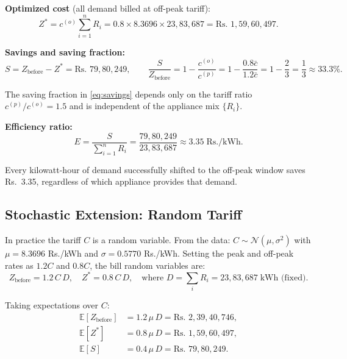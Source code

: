 \documentclass[12pt,a4paper]{article}
\begin{document}
\textbf{Optimized cost} (all demand billed at off-peak tariff):
\begin{equation}
  Z^* = c^{(o)}\sum_{i=1}^{n} R_i
  = 0.8 \times 8.3696 \times 23{,}83{,}687
  = \text{Rs.~} 1{,}59{,}60{,}497.
  \label{eq:zstar}
\end{equation}

\textbf{Savings and saving fraction:}
\begin{equation}
  S = Z_{\text{before}} - Z^* = \text{Rs.~} 79{,}80{,}249, \qquad
  \frac{S}{Z_{\text{before}}} = 1 - \frac{c^{(o)}}{c^{(p)}}
  = 1 - \frac{0.8\bar{c}}{1.2\bar{c}}
  = 1 - \frac{2}{3} = \frac{1}{3} \approx 33.3\%.
  \label{eq:savings}
\end{equation}

The saving fraction in \eqref{eq:savings} depends only on the tariff ratio
$c^{(p)}/c^{(o)} = 1.5$ and is independent of the appliance mix $\{R_i\}$.

\textbf{Efficiency ratio:}
\begin{equation}
  E = \frac{S}{\sum_{i=1}^n R_i}
  = \frac{79{,}80{,}249}{23{,}83{,}687}
  \approx 3.35\;\text{Rs./kWh}.
  \label{eq:eff}
\end{equation}

Every kilowatt-hour of demand successfully shifted to the off-peak window saves
Rs.~3.35, regardless of which appliance provides that demand.

\subsection{Stochastic Extension: Random Tariff}

In practice the tariff $C$ is a random variable. From the data:
$C \sim \mathcal{N}(\mu, \sigma^2)$ with $\mu = 8.3696$ Rs./kWh and
$\sigma = 0.5770$ Rs./kWh. Setting the peak and off-peak rates as $1.2C$ and $0.8C$,
the bill random variables are:
\begin{equation}
  Z_{\text{before}} = 1.2\,C\,D, \quad
  Z^* = 0.8\,C\,D, \quad
  \text{where } D = \sum_i R_i = 23{,}83{,}687\;\text{kWh (fixed)}.
\end{equation}

Taking expectations over $C$:
\begin{align}
  \mathbb{E}[Z_{\text{before}}] &= 1.2\,\mu\,D = \text{Rs.~} 2{,}39{,}40{,}746,
  \label{eq:e_before}\\
  \mathbb{E}[Z^*]               &= 0.8\,\mu\,D = \text{Rs.~} 1{,}59{,}60{,}497,
  \label{eq:e_star}\\
  \mathbb{E}[S]                 &= 0.4\,\mu\,D = \text{Rs.~} 79{,}80{,}249.
  \label{eq:e_saving}
\end{align}
\end{document}
